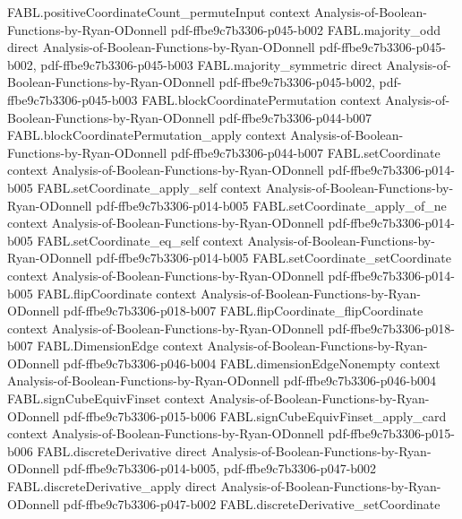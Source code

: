 \begin{theorem}
\proofstep
  {FABL.positiveCoordinateCount_permuteInput}
  {context}
  {Analysis-of-Boolean-Functions-by-Ryan-ODonnell}
  {pdf-ffbe9c7b3306-p045-b002}
\proofstep
  {FABL.majority_odd}
  {direct}
  {Analysis-of-Boolean-Functions-by-Ryan-ODonnell}
  {pdf-ffbe9c7b3306-p045-b002,
    pdf-ffbe9c7b3306-p045-b003}
\proofstep
  {FABL.majority_symmetric}
  {direct}
  {Analysis-of-Boolean-Functions-by-Ryan-ODonnell}
  {pdf-ffbe9c7b3306-p045-b002,
    pdf-ffbe9c7b3306-p045-b003}
\proofstep
  {FABL.blockCoordinatePermutation}
  {context}
  {Analysis-of-Boolean-Functions-by-Ryan-ODonnell}
  {pdf-ffbe9c7b3306-p044-b007}
\proofstep
  {FABL.blockCoordinatePermutation_apply}
  {context}
  {Analysis-of-Boolean-Functions-by-Ryan-ODonnell}
  {pdf-ffbe9c7b3306-p044-b007}
\proofstep
  {FABL.setCoordinate}
  {context}
  {Analysis-of-Boolean-Functions-by-Ryan-ODonnell}
  {pdf-ffbe9c7b3306-p014-b005}
\proofstep
  {FABL.setCoordinate_apply_self}
  {context}
  {Analysis-of-Boolean-Functions-by-Ryan-ODonnell}
  {pdf-ffbe9c7b3306-p014-b005}
\proofstep
  {FABL.setCoordinate_apply_of_ne}
  {context}
  {Analysis-of-Boolean-Functions-by-Ryan-ODonnell}
  {pdf-ffbe9c7b3306-p014-b005}
\proofstep
  {FABL.setCoordinate_eq_self}
  {context}
  {Analysis-of-Boolean-Functions-by-Ryan-ODonnell}
  {pdf-ffbe9c7b3306-p014-b005}
\proofstep
  {FABL.setCoordinate_setCoordinate}
  {context}
  {Analysis-of-Boolean-Functions-by-Ryan-ODonnell}
  {pdf-ffbe9c7b3306-p014-b005}
\proofstep
  {FABL.flipCoordinate}
  {context}
  {Analysis-of-Boolean-Functions-by-Ryan-ODonnell}
  {pdf-ffbe9c7b3306-p018-b007}
\proofstep
  {FABL.flipCoordinate_flipCoordinate}
  {context}
  {Analysis-of-Boolean-Functions-by-Ryan-ODonnell}
  {pdf-ffbe9c7b3306-p018-b007}
\proofstep
  {FABL.DimensionEdge}
  {context}
  {Analysis-of-Boolean-Functions-by-Ryan-ODonnell}
  {pdf-ffbe9c7b3306-p046-b004}
\proofstep
  {FABL.dimensionEdgeNonempty}
  {context}
  {Analysis-of-Boolean-Functions-by-Ryan-ODonnell}
  {pdf-ffbe9c7b3306-p046-b004}
\proofstep
  {FABL.signCubeEquivFinset}
  {context}
  {Analysis-of-Boolean-Functions-by-Ryan-ODonnell}
  {pdf-ffbe9c7b3306-p015-b006}
\proofstep
  {FABL.signCubeEquivFinset_apply_card}
  {context}
  {Analysis-of-Boolean-Functions-by-Ryan-ODonnell}
  {pdf-ffbe9c7b3306-p015-b006}
\proofstep
  {FABL.discreteDerivative}
  {direct}
  {Analysis-of-Boolean-Functions-by-Ryan-ODonnell}
  {pdf-ffbe9c7b3306-p014-b005,
    pdf-ffbe9c7b3306-p047-b002}
\proofstep
  {FABL.discreteDerivative_apply}
  {direct}
  {Analysis-of-Boolean-Functions-by-Ryan-ODonnell}
  {pdf-ffbe9c7b3306-p047-b002}
\proofstep
  {FABL.discreteDerivative_setCoordinate}

\end{theorem}
